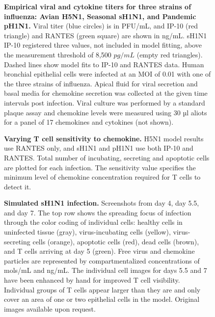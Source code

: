 \documentclass[10pt]{article}
\begin{document}
\begin{figure}[!ht]
\begin{center}
 \end{center}
\caption{{\bf Empirical viral and cytokine titers for three strains of influenza: Avian H5N1, Seasonal sH1N1, and Pandemic pH1N1.}  Viral titer (blue circles) is in PFU/mL, and IP-10 (red triangle) and RANTES (green square) are shown in ng/mL.  sH1N1 IP-10 registered three values, not included in model fitting, above the measurement threshold of 8,500 $pg/mL$ (empty red triangles).  Dashed lines show model fits to IP-10 and RANTES data.  Human bronchial epithelial cells were infected at an MOI of 0.01 with one of the three strains of influenza.  Apical fluid for viral secretion and basal media for chemokine secretion was collected at the given time intervals post infection.  Viral culture was performed by a standard plaque assay and chemokine levels were measured using 30 µl aliots for a panel of 17 chemokines and cytokines (not shown).} 
 \label{fig:data}
\end{figure}


\begin{figure}[!ht]
\begin{center}
 \end{center}
\caption{{\bf Varying T cell sensitivity to chemokine.}  H5N1 model results use RANTES  only, and sH1N1 and pH1N1 use both IP-10 and RANTES. Total number of incubating, secreting and apoptotic cells are plotted for each infection.  The sensitivity value specifies the minimum level of chemokine concentration required for T cells to detect it. } 
 \label{fig:sensitivity}
\end{figure}


\begin{figure}[!ht]
\begin{center}
 \end{center}
\caption{{\bf Simulated sH1N1 infection.} Screenshots from day 4, day 5.5, and day 7.  The top row shows the spreading focus of infection  through the color coding of individual cells:  healthy cells in uninfected tissue (gray),  virus-incubating cells (yellow), virus-secreting cells (orange), apoptotic cells (red), dead cells (brown), and T cells arriving at day 5 (green).  Free virus and chemokine particles are represented by compartmentalized concentrations of mols/mL and ng/mL.  The individual cell images for days 5.5 and 7 have been enhanced by hand for improved T cell visibility.  Individual groups of T cells appear larger than they are and only cover an area of one or two epithelial cells in the model.  Original images available upon request. } 
 \label{fig:cycells}
\end{figure}
\end{document}
